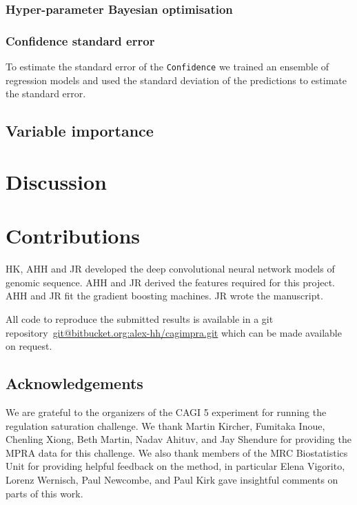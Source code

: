 \documentclass{article}
\begin{document}
\subsubsection*{Hyper-parameter Bayesian optimisation}



\subsubsection*{Confidence standard error}

To estimate the standard error of the \texttt{Confidence} we trained an
ensemble of regression models and used the standard deviation of the
predictions to estimate the standard error.


\subsection*{Variable importance}



\section*{Discussion}






\section*{Contributions}

HK, AHH and JR developed the deep convolutional neural network models of
genomic sequence. AHH and JR derived the features required for this
project. AHH and JR fit the gradient boosting machines. JR wrote the
manuscript.

All code to reproduce the submitted results is available in a git
repository~\url{git@bitbucket.org:alex-hh/cagimpra.git} which can be made
available on request.


\subsection*{Acknowledgements}

We are grateful to the organizers of the CAGI 5 experiment for running the
regulation saturation challenge. We thank Martin Kircher, Fumitaka Inoue,
Chenling Xiong, Beth Martin, Nadav Ahituv, and Jay Shendure for providing the
\ac{MPRA} data for this challenge. We also thank members of the MRC Biostatistics
Unit for providing helpful feedback on the method, in particular Elena
Vigorito, Lorenz Wernisch, Paul Newcombe, and Paul Kirk gave insightful
comments on parts of this work.


%
%
\printbibliography{}
\end{document}
